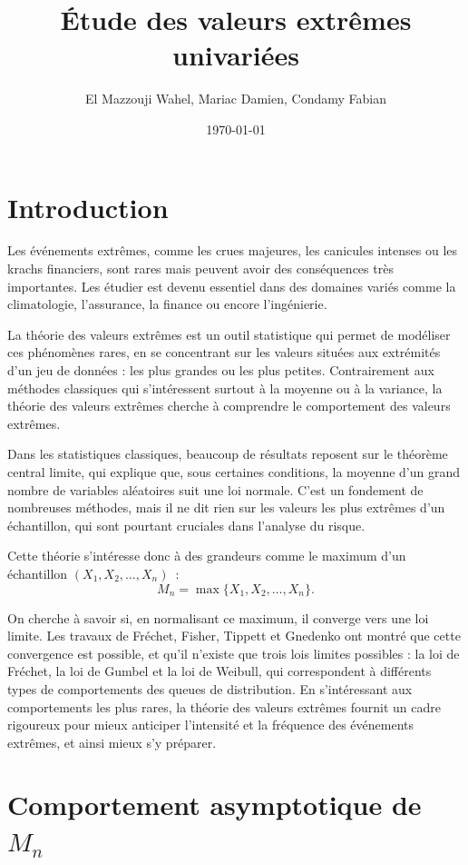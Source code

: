 \documentclass{article}
\title{Étude des valeurs extrêmes univariées}
\author{El Mazzouji Wahel, Mariac Damien, Condamy Fabian}
\date{\today}
\theoremstyle{plain}
\theoremstyle{definition}
\theoremstyle{plain}
\begin{document}
\maketitle 
\newpage
\tableofcontents 
\newpage
\section{Introduction}
Les événements extrêmes, comme les crues majeures, les canicules intenses ou les krachs financiers, sont rares mais peuvent avoir des conséquences très importantes. Les étudier est devenu essentiel dans des domaines variés comme la climatologie, l’assurance, la finance ou encore l’ingénierie.

\noindent La théorie des valeurs extrêmes est un outil statistique qui permet de modéliser ces phénomènes rares, en se concentrant sur les valeurs situées aux extrémités d’un jeu de données : les plus grandes ou les plus petites. Contrairement aux méthodes classiques qui s'intéressent surtout à la moyenne ou à la variance, la théorie des valeurs extrêmes cherche à comprendre le comportement des valeurs extrêmes.

\noindent Dans les statistiques classiques, beaucoup de résultats reposent sur le théorème central limite, qui explique que, sous certaines conditions, la moyenne d’un grand nombre de variables aléatoires suit une loi normale. C’est un fondement de nombreuses méthodes, mais il ne dit rien sur les valeurs les plus extrêmes d’un échantillon, qui sont pourtant cruciales dans l’analyse du risque.

\noindent Cette théorie s’intéresse donc à des grandeurs comme le maximum d’un échantillon $(X_1, X_2, \dots, X_n)$~:
\[
M_n = \max\{X_1, X_2, \dots, X_n\}.
\]

On cherche à savoir si, en normalisant ce maximum, il converge vers une loi limite. Les travaux de Fréchet, Fisher, Tippett et Gnedenko ont montré que cette convergence est possible, et qu’il n’existe que trois lois limites possibles : la loi de Fréchet, la loi de Gumbel et la loi de Weibull, qui correspondent à différents types de comportements des queues de distribution.
En s’intéressant aux comportements les plus rares, la théorie des valeurs extrêmes fournit un cadre rigoureux pour mieux anticiper l’intensité et la fréquence des événements extrêmes, et ainsi mieux s’y préparer.
\section{Comportement asymptotique de $M_n$}
\end{document}
